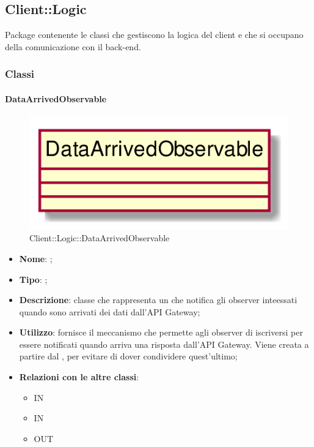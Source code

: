 \subsection{Client::Logic}
Package contenente le classi che gestiscono la logica del client e che si occupano della comunicazione con il back-end.
\subsubsection{Classi}
\hypertarget{DataArrivedObservable_label}{\paragraph{DataArrivedObservable}}
\begin{figure}[h]
	\centering
	\includegraphics[width=\textwidth,height=\textheight,keepaspectratio]{images/ClassDataArrivedObservable.png}
	\caption{Client::Logic::DataArrivedObservable}
\end{figure}
\begin{itemize}
	\item \textbf{Nome}: ;
	\item \textbf{Tipo}: ;
	\item \textbf{Descrizione}: classe che rappresenta un  che notifica gli observer inteessati quando sono arrivati dei dati dall'API Gateway;
	\item \textbf{Utilizzo}: fornisce il meccanismo che permette agli observer di iscriversi per essere notificati quando arriva una risposta dall'API Gateway. Viene creata a partire dal , per evitare di dover condividere quest'ultimo;
	\item \textbf{Relazioni con le altre classi}:
	\begin{itemize}
		\item IN \hyperlink{ApplicationManagerObserver_label}{}
		\item IN \hyperlink{PlayerObserver_label}{}
		\item OUT \hyperlink{DataArrivedSubject_label}{}
	\end{itemize}
\end{itemize}

